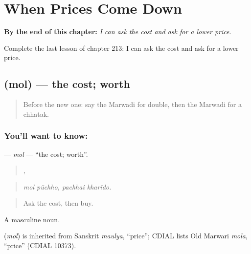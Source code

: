 
\chapter{When Prices Come Down}
\label{ch:mw-when-prices-come-down}

\begin{chapteropening}
\textbf{By the end of this chapter:} \emph{I can ask the cost and ask for a lower price.}

Complete the last lesson of chapter 213: I can ask the cost and ask for a lower price.
\end{chapteropening}

\section[\texorpdfstring{\mw{मोल} (mol)}{मोल (mol)}]{ (mol) — the cost; worth}

\label{lesson:MW-C213-mol}



\begin{quote}
Before the new one: say the Marwadi for double, then the Marwadi for a chhatak.
\end{quote}

\subsection*{You'll want to know: }
\textbf{} — \emph{mol} — \textquotedblleft{}the cost; worth\textquotedblright{}.

\begin{quote}
 ,  
\end{quote}

\begin{quote}
\emph{mol pūchho, pachhai kharīdo.}
\end{quote}

\begin{quote}
Ask the cost, then buy.
\end{quote}

A masculine noun.

\begin{cousinweb}
\textbf{} (\emph{mol}) is inherited from Sanskrit \emph{maulya}, \textquotedblleft{}price\textquotedblright{}; CDIAL lists Old Marwari \emph{mola}, \textquotedblleft{}price\textquotedblright{} (CDIAL 10373).
\end{cousinweb}

